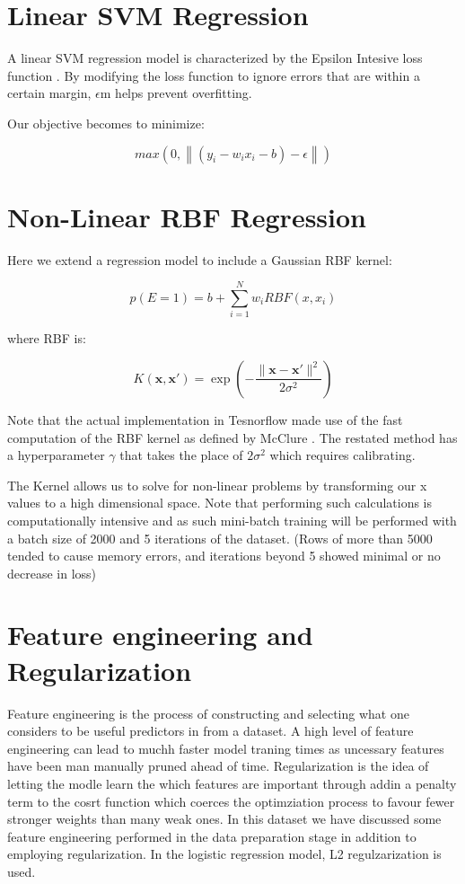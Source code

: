 \section{Linear SVM Regression}

A linear SVM regression model is characterized by the Epsilon Intesive loss function \parencite{Vapnik}. By modifying the loss function to ignore errors that are within a certain margin, $\epsilon$m helps prevent overfitting.

Our objective becomes to minimize:

$$max(0,\left\| (y_i - w_i x_i - b) - \epsilon \right\|)$$


\section{Non-Linear RBF Regression}

Here we extend a regression model to include a Gaussian RBF kernel:

$$p(E=1)=b+\sum^N_{i=1}w_iRBF(x,x_i)$$

where RBF is:

$$K(\mathbf {x} ,\mathbf {x'} )=\exp \left(-{\frac {\|\mathbf {x} -\mathbf {x'} \|^{2}}{2\sigma ^{2}}}\right)$$

Note that the actual implementation in Tesnorflow made use of the fast computation of the RBF kernel as defined by McClure \parencite{TFCookbook}. The restated method has a hyperparameter $\gamma$ that takes the place of $2\sigma^2$ which requires calibrating.

The Kernel allows us to solve for non-linear problems by transforming our x values to a high dimensional space. Note that performing such calculations is computationally intensive and as such mini-batch training will be performed with a batch size of 2000 and 5 iterations of the dataset. (Rows of more than 5000 tended to cause memory errors, and iterations beyond 5 showed minimal or no decrease in loss)

\section{Feature engineering and Regularization}

Feature engineering is the process of constructing and selecting what one considers to be useful predictors in from a dataset. A high level of feature engineering can lead to muchh faster model traning times as uncessary features have been man manually pruned ahead of time. Regularization is the idea of letting the modle learn the which features are important through addin a penalty term to the cosrt function which coerces the optimziation process to favour fewer stronger weights than many weak ones. In this dataset we have discussed some feature engineering performed in the data preparation stage in addition to employing regularization. In the logistic regression model, L2 regulzarization is used.


